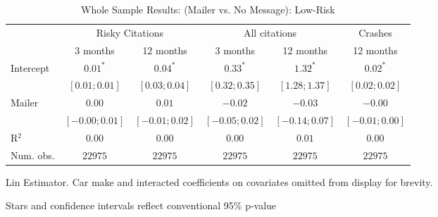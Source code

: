 
\begin{table}
\caption{Whole Sample Results: (Mailer vs. No Message): Low-Risk}
\begin{center}
\begin{threeparttable}
\begin{tabular}{l c c c c c}
\hline
 & \multicolumn{2}{c}{Risky Citations} & \multicolumn{2}{c}{All citations} & \multicolumn{1}{c}{Crashes} \\
\cline{2-3} \cline{4-5} \cline{6-6}
 & 3 months & 12 months & 3 months & 12 months & 12 months \\
\hline
Intercept & $0.01^{*}$       & $0.04^{*}$       & $0.33^{*}$       & $1.32^{*}$       & $0.02^{*}$       \\
          & $ [ 0.01; 0.01]$ & $ [ 0.03; 0.04]$ & $ [ 0.32; 0.35]$ & $ [ 1.28; 1.37]$ & $ [ 0.02; 0.02]$ \\
Mailer    & $0.00$           & $0.01$           & $-0.02$          & $-0.03$          & $-0.00$          \\
          & $ [-0.00; 0.01]$ & $ [-0.01; 0.02]$ & $ [-0.05; 0.02]$ & $ [-0.14; 0.07]$ & $ [-0.01; 0.00]$ \\
\hline
R$^2$     & $0.00$           & $0.00$           & $0.00$           & $0.01$           & $0.00$           \\
Num. obs. & $22975$          & $22975$          & $22975$          & $22975$          & $22975$          \\
\hline
\end{tabular}
\begin{tablenotes}[flushleft]
\scriptsize{\item Lin Estimator. Car make and interacted coefficients on covariates omitted from display for brevity.
                             \item Stars and confidence intervals reflect conventional 95\% p-value}
\end{tablenotes}
\end{threeparttable}
\label{table:coefficients}
\end{center}
\end{table}
